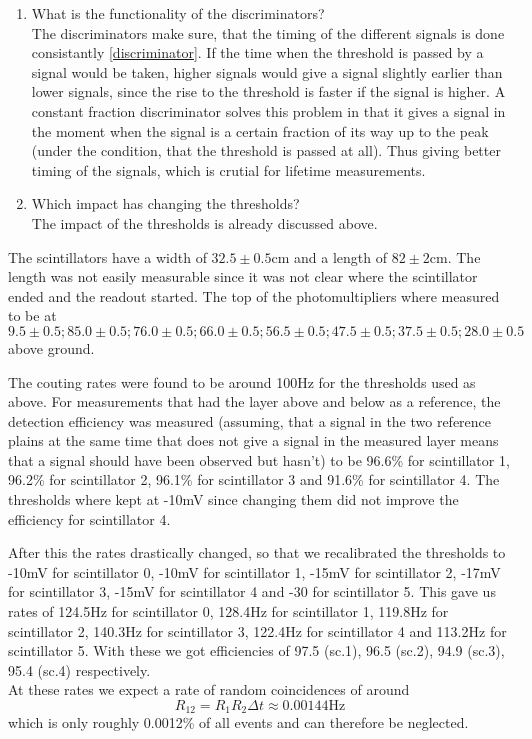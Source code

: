 \begin{enumerate}
\item What is the functionality of the discriminators?\\
The discriminators make sure, that the timing of the different signals is done consistantly \ref{discriminator}. If the time when the threshold is passed by a signal would be taken, higher signals would give a signal slightly earlier than lower signals, since the rise to the threshold is faster if the signal is higher. A constant fraction discriminator solves this problem in that it gives a signal in the moment when the signal is a certain fraction of its way up to the peak (under the condition, that the threshold is passed at all). Thus giving better timing of the signals, which is crutial for lifetime measurements.  
\item Which impact has changing the thresholds?\\
The impact of the thresholds is already discussed above. 
\end{enumerate}

The scintillators have a width of $32.5\pm0.5$cm and a length of $82\pm2$cm. The length was not easily measurable since it was not clear where the scintillator ended and the readout started. The top of the photomultipliers where measured to be at $9.5 \pm 0.5; 85.0 \pm 0.5; 76.0 \pm 0.5; 66.0 \pm 0.5; 56.5 \pm 0.5; 47.5 \pm 0.5; 37.5 \pm 0.5; 28.0 \pm 0.5$ above ground. 

The couting rates were found to be around 100Hz for the thresholds used as above. For measurements that had the layer above and below as a reference, the detection efficiency was measured (assuming, that a signal in the two reference plains at the same time that does not give a signal in the measured layer means that a signal should have been observed but hasn't) to be 96.6\% for scintillator 1, 96.2\% for scintillator 2, 96.1\% for scintillator 3 and 91.6\% for scintillator 4. The thresholds where kept at -10mV since changing them did not improve the efficiency for scintillator 4. 

After this the rates drastically changed, so that we recalibrated the thresholds to -10mV for scintillator 0, -10mV for scintillator 1, -15mV for scintillator 2, -17mV for scintillator 3, -15mV for scintillator 4 and -30 for scintillator 5.
This gave us rates of 124.5Hz for scintillator 0, 128.4Hz for scintillator 1, 119.8Hz for scintillator 2, 140.3Hz for scintillator 3, 122.4Hz for scintillator 4 and 113.2Hz for scintillator 5. With these we got efficiencies of 97.5 (sc.1), 96.5 (sc.2), 94.9 (sc.3), 95.4 (sc.4) respectively. \\
At these rates we expect a rate of random coincidences of around 
\begin{equation}
	R_{12} = R_1R_2\Delta t \approx 0.00144\text{Hz}
\end{equation}
which is only roughly 0.0012\% of all events and can therefore be neglected.
\\


